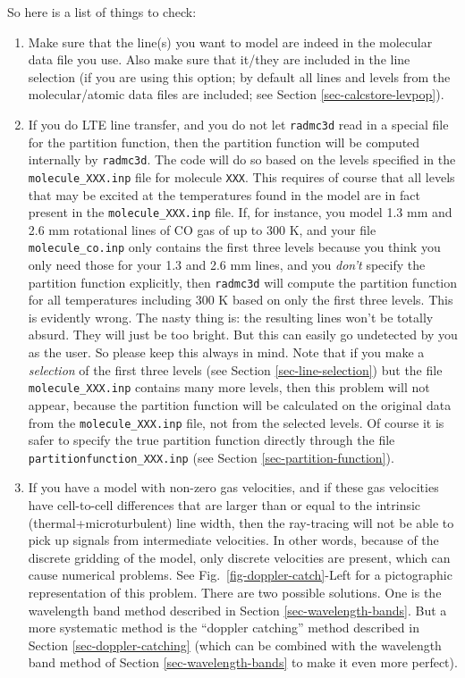 \documentclass{report}
\begin{document}
So here is a list of things to check:
\begin{enumerate}
\item Make sure that the line(s) you want to model are indeed in the
  molecular data file you use. Also make sure that it/they are included in
  the line selection (if you are using this option; by default all lines and
  levels from the molecular/atomic data files are included; see Section
  \ref{sec-calcstore-levpop}).
\item If you do LTE line transfer, and you do not let {\small\tt radmc3d}
  read in a special file for the partition function, then the partition
  function will be computed internally by {\small\tt radmc3d}. The code will
  do so based on the levels specified in the {\small\tt molecule\_XXX.inp}
  file for molecule {\small\tt XXX}. This requires of course that all levels
  that may be excited at the temperatures found in the model are in fact
  present in the {\small\tt molecule\_XXX.inp} file. If, for instance, you
  model 1.3 mm and 2.6 mm rotational lines of CO gas of up to 300 K, and
  your file {\small\tt molecule\_co.inp} only contains the first three
  levels because you think you only need those for your 1.3 and 2.6 mm
  lines, and you {\em don't} specify the partition function explicitly, then
  {\small\tt radmc3d} will compute the partition function for all
  temperatures including 300 K based on only the first three levels. This is
  evidently wrong. The nasty thing is: the resulting lines won't be totally
  absurd. They will just be too bright. But this can easily go undetected by
  you as the user. So please keep this always in mind.  Note that if you
  make a {\em selection} of the first three levels (see Section
  \ref{sec-line-selection}) but the file {\small\tt molecule\_XXX.inp}
  contains many more levels, then this problem will not appear, because the
  partition function will be calculated on the original data from the
  {\small\tt molecule\_XXX.inp} file, not from the selected levels.  Of
  course it is safer to specify the true partition function directly through
  the file {\small\tt partitionfunction\_XXX.inp} (see Section
  \ref{sec-partition-function}).
\item If you have a model with non-zero gas velocities, and if these gas
  velocities have cell-to-cell differences that are larger than or equal to
  the intrinsic (thermal+microturbulent) line width, then the ray-tracing
  will not be able to pick up signals from intermediate velocities. In other
  words, because of the discrete gridding of the model, only discrete
  velocities are present, which can cause numerical problems. See
  Fig.~\ref{fig-doppler-catch}-Left for a pictographic representation of
  this problem. There are two possible solutions. One is the wavelength band
  method described in Section \ref{sec-wavelength-bands}.  But a more
  systematic method is the ``doppler catching'' method described in Section
  \ref{sec-doppler-catching} (which can be combined with the wavelength band
  method of Section \ref{sec-wavelength-bands} to make it even more
  perfect).
\end{enumerate}
\end{document}
